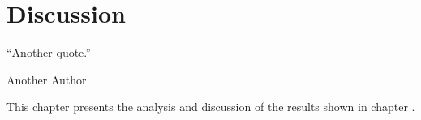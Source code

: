 
\chapter{Discussion}
\epigraph{``Another quote.''}{\vspace{10pt}Another Author}
\label{chapter:discussion}

\newpage

This chapter presents the analysis and discussion of the results shown in chapter .


